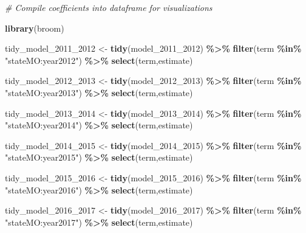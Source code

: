 \documentclass[
]{article}
\newenvironment{Shaded}{\begin{snugshade}}{\end{snugshade}}
\newcommand{\CommentTok}[1]{\textcolor[rgb]{0.56,0.35,0.01}{\textit{#1}}}
\newcommand{\FunctionTok}[1]{\textcolor[rgb]{0.13,0.29,0.53}{\textbf{#1}}}
\newcommand{\NormalTok}[1]{#1}
\newcommand{\OtherTok}[1]{\textcolor[rgb]{0.56,0.35,0.01}{#1}}
\newcommand{\SpecialCharTok}[1]{\textcolor[rgb]{0.81,0.36,0.00}{\textbf{#1}}}
\newcommand{\StringTok}[1]{\textcolor[rgb]{0.31,0.60,0.02}{#1}}
\begin{document}
\begin{Shaded}
\begin{Highlighting}[]
\CommentTok{\# Compile coefficients into dataframe for visualizations}

\FunctionTok{library}\NormalTok{(broom)}

\NormalTok{tidy\_model\_2011\_2012 }\OtherTok{\textless{}{-}} \FunctionTok{tidy}\NormalTok{(model\_2011\_2012) }\SpecialCharTok{\%\textgreater{}\%}
  \FunctionTok{filter}\NormalTok{(term }\SpecialCharTok{\%in\%} \StringTok{"stateMO:year2012"}\NormalTok{) }\SpecialCharTok{\%\textgreater{}\%}
           \FunctionTok{select}\NormalTok{(term,estimate)}

\NormalTok{tidy\_model\_2012\_2013 }\OtherTok{\textless{}{-}} \FunctionTok{tidy}\NormalTok{(model\_2012\_2013) }\SpecialCharTok{\%\textgreater{}\%}
  \FunctionTok{filter}\NormalTok{(term }\SpecialCharTok{\%in\%} \StringTok{"stateMO:year2013"}\NormalTok{) }\SpecialCharTok{\%\textgreater{}\%}
           \FunctionTok{select}\NormalTok{(term,estimate)}


\NormalTok{tidy\_model\_2013\_2014 }\OtherTok{\textless{}{-}} \FunctionTok{tidy}\NormalTok{(model\_2013\_2014) }\SpecialCharTok{\%\textgreater{}\%}
  \FunctionTok{filter}\NormalTok{(term }\SpecialCharTok{\%in\%} \StringTok{"stateMO:year2014"}\NormalTok{) }\SpecialCharTok{\%\textgreater{}\%}
           \FunctionTok{select}\NormalTok{(term,estimate)}

\NormalTok{tidy\_model\_2014\_2015 }\OtherTok{\textless{}{-}} \FunctionTok{tidy}\NormalTok{(model\_2014\_2015) }\SpecialCharTok{\%\textgreater{}\%}
  \FunctionTok{filter}\NormalTok{(term }\SpecialCharTok{\%in\%} \StringTok{"stateMO:year2015"}\NormalTok{) }\SpecialCharTok{\%\textgreater{}\%}
           \FunctionTok{select}\NormalTok{(term,estimate)}

\NormalTok{tidy\_model\_2015\_2016 }\OtherTok{\textless{}{-}} \FunctionTok{tidy}\NormalTok{(model\_2015\_2016) }\SpecialCharTok{\%\textgreater{}\%}
  \FunctionTok{filter}\NormalTok{(term }\SpecialCharTok{\%in\%} \StringTok{"stateMO:year2016"}\NormalTok{) }\SpecialCharTok{\%\textgreater{}\%}
           \FunctionTok{select}\NormalTok{(term,estimate)}

\NormalTok{tidy\_model\_2016\_2017 }\OtherTok{\textless{}{-}} \FunctionTok{tidy}\NormalTok{(model\_2016\_2017) }\SpecialCharTok{\%\textgreater{}\%}
  \FunctionTok{filter}\NormalTok{(term }\SpecialCharTok{\%in\%} \StringTok{"stateMO:year2017"}\NormalTok{) }\SpecialCharTok{\%\textgreater{}\%}
           \FunctionTok{select}\NormalTok{(term,estimate)}


\end{Highlighting}
\end{Shaded}
\end{document}
